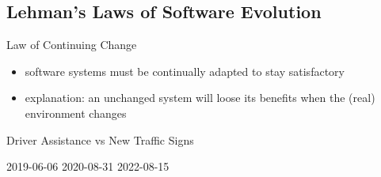 \subsection{Lehman's Laws of Software Evolution}
\begin{frame}{\insertsubsection}
	\begin{fancycolumns}[widths={60}]
		\begin{definition}{Law of Continuing Change\mysource{\lehmanslaws}}
			\begin{itemize}
				\item software systems must be continually adapted to stay satisfactory %
				\item explanation: an unchanged system will loose its benefits when the (real) environment changes
			\end{itemize}
		\end{definition}
		\begin{example}{Driver Assistance vs New Traffic Signs}
			\begin{fancycolumns}[b,columns=3,animation=none]
				\centering{}
				2019-06-06
			\nextcolumn
				\centering{}
				2020-08-31
			\nextcolumn
				\centering{}
				2022-08-15
			\end{fancycolumns}
		\end{example}
		\nextcolumn
		\centering{}
	\end{fancycolumns}
\end{frame}


